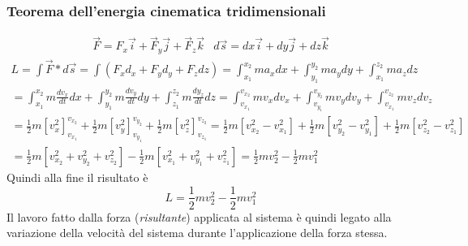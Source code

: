 \subsubsection{Teorema dell'energia cinematica tridimensionali}
\begin{eqnarray*}
	\vec{F}=F_x\vec{i}+\vec{F}_y\vec{j}+\vec{F}_z\vec{k}
	& d\vec{s}=dx\vec{i}+dy\vec{j}+dz\vec{k}
\end{eqnarray*}
\begin{eqnarray*}
	L=\int \vec{F}*d\vec{s}=\int
	\left(F_xd_x+F_yd_y+F_zdz\right)=\int_{x_1}^{x_2}ma_xdx+\int_{y_1}^{y_2}
	ma_ydy+\int_{x_1}^{z_2}ma_zdz\\ = \int_{x_1}^{x_2}m\frac{dv_x}{dt}dx+
	\int_{y_1}^{y_2}m\frac{dv_y}{dt}dy+\int_{z_1}^{z_2}m\frac{dy_z}{dt}dz=
	\int_{v_{x_1}}^{v_{x_2}}mv_xdv_x+\int_{v_{y_1}}^{v_{y_2}} mv_ydv_y
	+\int_{v_{x_1}}^{v_{z_2}}mv_zdv_z\\
	=\frac{1}{2}m\left[v_x^2\right]_{v_{x_1}}^{v_{x_2}}+ 
	\frac{1}{2}m\left[v_y^2\right]_{v_{y_1}}^{v_{y_2}}+\frac{1}{2}m
	\left[v_z^2\right]_{v_{z_1}}^{v_{z_2}}=
	\frac{1}{2}m\left[v_{x_2}^2-v_{x_1}^2\right]+
	\frac{1}{2}m\left[v_{y_2}^2-v_{y_1}^2\right]+
	\frac{1}{2}m\left[v_{z_2}^2-v_{z_1}^2\right]\\
	=\frac{1}{2}m\left[v_{x_2}^2+v_{y_2}^2+v_{z_2}^2\right]
	-\frac{1}{2}m\left[v_{x_1}^2+v_{y_1}^2+v_{z_1}^2\right]=\frac{1}{2}mv_2^2
	-\frac{1}{2}mv_1^2
\end{eqnarray*}
Quindi alla fine il risultato è 
\begin{equation*}
	\boxed{L=\frac{1}{2}mv_2^2
	-\frac{1}{2}mv_1^2}
\end{equation*}
Il lavoro fatto dalla forza ({\it risultante}) applicata al sistema è quindi
legato alla variazione della velocità del sistema durante l’applicazione della
forza stessa.
